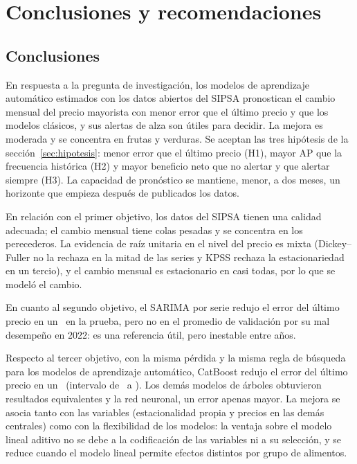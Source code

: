 \chapter{Conclusiones y recomendaciones}
\label{cap:conclusiones}

\section{Conclusiones}

En respuesta a la pregunta de investigación, los modelos de aprendizaje automático estimados con los datos abiertos del SIPSA pronostican el cambio mensual del precio mayorista con menor error que el último precio y que los modelos clásicos, y sus alertas de alza son útiles para decidir. La mejora es moderada y se concentra en frutas y verduras. Se aceptan las tres hipótesis de la sección~\ref{sec:hipotesis}: menor error que el último precio (H1), mayor AP que la frecuencia histórica (H2) y mayor beneficio neto que no alertar y que alertar siempre (H3). La capacidad de pronóstico se mantiene, menor, a dos meses, un horizonte que empieza después de publicados los datos.

En relación con el primer objetivo, los datos del SIPSA tienen una calidad adecuada; el cambio mensual tiene colas pesadas y se concentra en los perecederos. La evidencia de raíz unitaria en el nivel del precio es mixta (Dickey--Fuller no la rechaza en la mitad de las series y KPSS rechaza la estacionariedad en un tercio), y el cambio mensual es estacionario en casi todas, por lo que se modeló el cambio.

En cuanto al segundo objetivo, el SARIMA por serie redujo el error del último precio en un \cmejsar\pct\ en la prueba, pero no en el promedio de validación por su mal desempeño en 2022: es una referencia útil, pero inestable entre años.

Respecto al tercer objetivo, con la misma pérdida y la misma regla de búsqueda para los modelos de aprendizaje automático, CatBoost redujo el error del último precio en un \cmeje\pct\ (intervalo de \cmejloe\pct\ a \cmejhie\pct). Los demás modelos de árboles obtuvieron resultados equivalentes y la red neuronal, un error apenas mayor. La mejora se asocia tanto con las variables (estacionalidad propia y precios en las demás centrales) como con la flexibilidad de los modelos: la ventaja sobre el modelo lineal aditivo no se debe a la codificación de las variables ni a su selección, y se reduce cuando el modelo lineal permite efectos distintos por grupo de alimentos.

